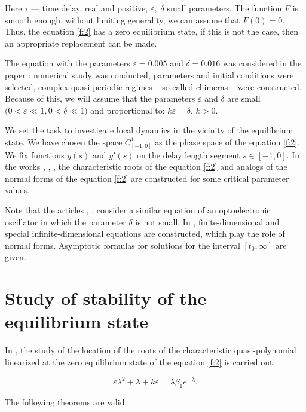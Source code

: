 \documentclass[12pt]{article} %
\newcommand{\eps}{\varepsilon}
\begin{document}
\noindent Here \(\tau\) --- time delay, real and positive, $\eps,\;\delta$ small parameters. The function $F$ is smooth enough, without limiting generality, we can assume that \(F(0)=0\). Thus, the equation \eqref{f:2} has a zero equilibrium state, if this is not the case, then an appropriate replacement can be made.

 The equation with the parameters  \(\varepsilon=0.005 \) and \(\delta=0.016\) was considered in the paper \cite{S1}:  numerical study was conducted, parameters and initial conditions were selected, complex quasi-periodic regimes – so-called chimeras – were constructed. Because of this, we will assume that the parameters \(\varepsilon\) and \(\delta\) are small $(0<\varepsilon\ll 1,$$0<\delta\ll1)$ and proportional to: \(k\varepsilon=\delta\), \(k>0\).

We set the task to investigate local dynamics in the vicinity of the equilibrium state. We have chosen the space  $C^1_{[-1,0]}$ as the phase space of the equation \eqref{f:2}. We fix functions $y(s)$ and $y'(s)$ on the delay length segment $s\in[-1,0]$. In the works \cite{M1}, \cite{M2}, \cite{M3}, the characteristic roots of the equation \eqref{f:2} and analogs of the normal forms of the equation \eqref{f:2} are constructed for some critical parameter values.

Note that the articles \cite{S2}, \cite{S3}, \cite{S4} consider a similar equation of an optoelectronic oscillator in which the parameter \(\delta\) is not small. In \cite{S2}, finite-dimensional and special infinite-dimensional equations are constructed, which play the role of normal forms. Asymptotic formulas for solutions for the interval $[t_0,\infty]$ are given.

\newpage

\section{Study of stability of the equilibrium state}



In \cite{M1}, the study of the location of the roots of the characteristic quasi-polynomial linearized at the zero equilibrium state of the equation \eqref{f:2} is carried out:

\begin{equation}
\eps\lambda^{2}+\lambda+k\varepsilon =\lambda\beta_1 e^{-\lambda }.
\label{f:3}
\end{equation}

\noindent The following theorems are valid.
\end{document}
